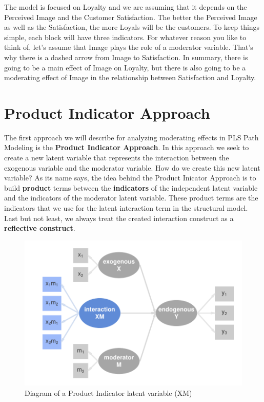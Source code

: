 \documentclass[12pt]{book}\usepackage{graphicx, color}
\newenvironment{knitrout}{}{} %
\begin{document}
The model is focused on Loyalty and we are assuming that it depends on the Perceived Image and the Customer Satisfaction. The better the Perceived Image as well as the Satisfaction, the more Loyals will be the customers. To keep things simple, each block will have three indicators. For whatever reason you like to think of, let's assume that Image plays the role of a moderator variable. That's why there is a dashed arrow from Image to Satisfaction. In summary, there is going to be a main effect of Image on Loyalty, but there is also going to be a moderating effect of Image in the relationship between Satisfaction and Loyalty.



\section{Product Indicator Approach}
The first approach we will describe for analyzing moderating effects in PLS Path Modeling is the \textbf{Product Indicator Approach}. In this approach we seek to create a new latent variable that represents the interaction between the exogenous variable and the moderator variable. How do we create this new latent variable? As its name says, the idea behind the Product Inicator Approach is to build \textbf{product} terms between the \textbf{indicators} of the independent latent variable and the indicators of the moderator latent variable. These product terms are the indicators that we use for the latent interaction term in the structural model. Last but not least, we always treat the created interaction construct as a \textbf{reflective construct}.





\begin{knitrout}
\color{fgcolor}\begin{figure}[h]


{\centering \includegraphics[width=.8\linewidth,height=.5\linewidth]{figure/prod_ind_app_diag} 

}

\caption[Diagram of a Product Indicator latent variable (XM)]{Diagram of a Product Indicator latent variable (XM)\label{fig:prod_ind_app_diag}}
\end{figure}


\end{knitrout}
\end{document}
